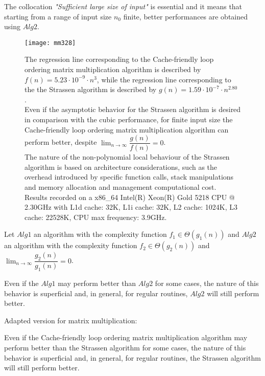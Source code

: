 The collocation
\textit{"Sufficient large size of input"} is essential and it means that starting from a range of input size $n_{0}$ finite, better performances are obtained using $Alg2$.


\begin{figure}[H]
\centering
\texttt{[image: mm328]}
\caption{The regression line corresponding to the Cache-friendly loop ordering matrix multiplication algorithm is described by $f(n) = 5.23 \cdot 10^{-9} \cdot n^{3} $, while the regression line corresponding to the the Strassen algorithm is described by $g(n) = 1.59 \cdot 10^{-7} \cdot n^{2.80} $ . \\  Even if the asymptotic behavior for the Strassen algorithm is desired in comparison with the cubic performance, for finite input size the Cache-friendly loop ordering matrix multiplication algorithm can perform better, despite $\lim_{n\to\infty} \dfrac{g(n)}{f(n)} = 0$.  \\ The nature of the non-polynomial local behaviour of the Strassen algorithm is based on architecture considerations, such as the overhead introduced by specific function calls, stack manipulations and memory allocation and management computational cost. \\ Results recorded on a x86\_64 Intel(R) Xeon(R) Gold 5218 CPU @ 2.30GHz with L1d cache: 32K, L1i cache: 32K, L2 cache: 1024K, L3 cache: 22528K, CPU max frequency: 3.9GHz.}
\end{figure}


\begin{pitfall}
Let $Alg1$ an algorithm with the complexity function $f_{1} \in \Theta(g_1(n))$  and $Alg2$ an algorithm with the complexity function $f_{2} \in \Theta(g_2(n))$ and $\lim_{n\to\infty} \dfrac{g_2(n)}{g_1(n)} = 0$.

Even if the $Alg1$ may perform better than $Alg2$ for some cases, the nature of this behavior is superficial and, in general, for regular routines, $Alg2$ will still perform better.
\end{pitfall}

\begin{pitfall}
Adapted version for matrix multiplication:

Even if the Cache-friendly loop ordering matrix multiplication algorithm may perform better than the Strassen algorithm for some cases, the nature of this behavior is superficial and, in general, for regular routines, the Strassen algorithm will still perform better.
\end{pitfall}

